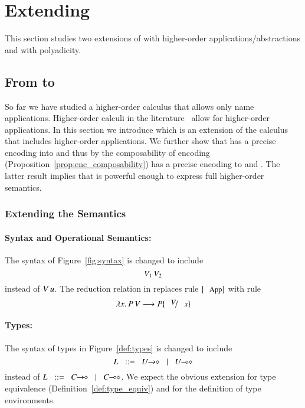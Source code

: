 \section{Extending \HOp}
\label{sec:extension}

This section studies two extensions of \HOp 
with higher-order applications/abstractions 
and 
with polyadicity.

\subsection{From \HOp to \HOpp}

So far we have studied a higher-order calculus that allows
only name applications. Higher-order calculi in the
literature~\cite{} allow for higher-order applications.
In this section we introduce \HOpp which is an 
extension of the \HOp calculus that includes
higher-order applications.
We further show that \HOpp has a precise encoding
into \HOp and thus by the composability of
encoding (Proposition~\ref{prop:enc_composability})
\HOpp has a precise encoding to \HO and \sessp.
The latter result implies that \HO is powerful
enough to express full higher-order semantics.

\subsubsection{Extending the Semantics}

\paragraph{Syntax and Operational Semantics:}
The syntax of Figure~\ref{fig:syntax} is changed to
include $$V_1\,V_2$$ instead of $V\,u$.
The reduction relation in 
replaces rule $\orule{App}$ 
with rule $$\appl{\abs{x}{P}}{V} \red P \subst{V}{x}$$

\paragraph{Types:}
The syntax of types in Figure~\ref{def:types}
is changed to include $$L \bnfis \shot{U} \bnfbar \lhot{U}$$
instead of $L \bnfis \shot{C} \bnfbar \lhot{C}$.
We expect the obvious extension for type equivalence
(Definition~\ref{def:type_equiv})
and for the definition of type environments.

